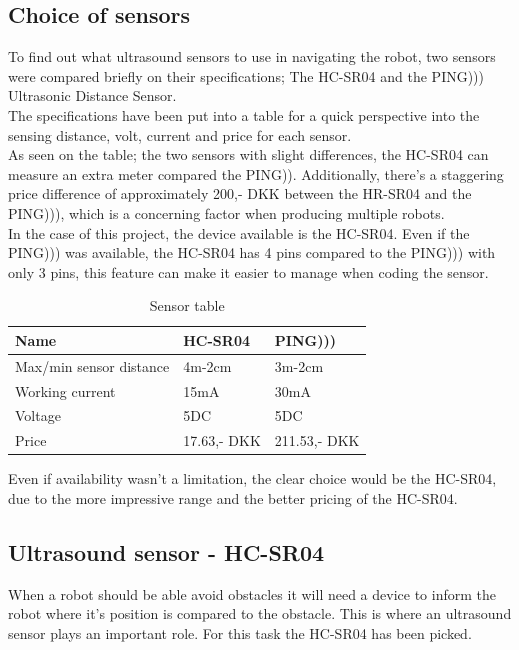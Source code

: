 \subsection{Choice of sensors}
To find out what ultrasound sensors to use in navigating the robot, two sensors were compared briefly on their specifications; The HC-SR04 and the PING))) Ultrasonic Distance Sensor.\\
The specifications have been put into a table for a quick perspective into the sensing distance, volt, current and price for each sensor.\\

As seen on the table; the two sensors with slight differences, the HC-SR04 can measure an extra meter compared the PING)). Additionally, there's a staggering price difference of approximately 200,- DKK between the HR-SR04 and the PING))), which is a concerning factor when producing multiple robots.\\

In the case of this project, the device available is the HC-SR04. Even if the PING))) was available, the HC-SR04 has 4 pins compared to the PING))) with only 3 pins, this feature can make it easier to manage when coding the sensor.\\

\begin{table}[!ht]
\centering

\label{Sensor table}
\begin{tabular}{|l|l|l|}
\hline
\textbf{Name}           & HC-SR04   & PING)))    \\ \hline
Max/min sensor distance & 4m-2cm    & 3m-2cm     \\ \hline
Working current         & 15mA      & 30mA       \\ \hline
Voltage                 & 5DC       & 5DC        \\ \hline
Price                   & 17.63,- DKK & 211.53,- DKK \\ \hline
\end{tabular}
\caption{Sensor table \cite{HC-SR04} \cite{PING}}

\end{table}

Even if availability wasn't a limitation, the clear choice would be the HC-SR04, due to the more impressive range and the better pricing of the HC-SR04.

\subsection{Ultrasound sensor - HC-SR04}
When a robot should be able avoid obstacles it will need a device to inform the robot where it's position is compared to the obstacle. This is where an ultrasound sensor plays an important role. For this task the HC-SR04 has been picked.\\

